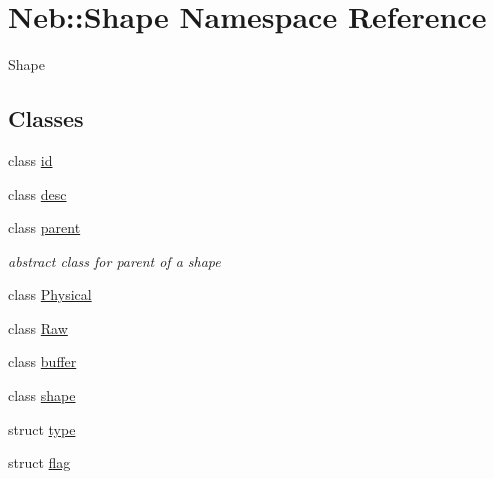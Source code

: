 \hypertarget{namespaceNeb_1_1Shape}{\section{\-Neb\-:\-:\-Shape \-Namespace \-Reference}
\label{namespaceNeb_1_1Shape}
}


\-Shape  


\subsection*{\-Classes}
\begin{DoxyCompactItemize}
\item 
class \hyperlink{classNeb_1_1Shape_1_1id}{id}
\item 
class \hyperlink{classNeb_1_1Shape_1_1desc}{desc}
\item 
class \hyperlink{classNeb_1_1Shape_1_1parent}{parent}
\begin{DoxyCompactList}\small\item\em abstract class for parent of a shape \end{DoxyCompactList}\item 
class \hyperlink{classNeb_1_1Shape_1_1Physical}{\-Physical}
\item 
class \hyperlink{classNeb_1_1Shape_1_1Raw}{\-Raw}
\item 
class \hyperlink{classNeb_1_1Shape_1_1buffer}{buffer}
\item 
class \hyperlink{classNeb_1_1Shape_1_1shape}{shape}
\item 
struct \hyperlink{structNeb_1_1Shape_1_1type}{type}
\item 
struct \hyperlink{structNeb_1_1Shape_1_1flag}{flag}
\end{DoxyCompactItemize}
